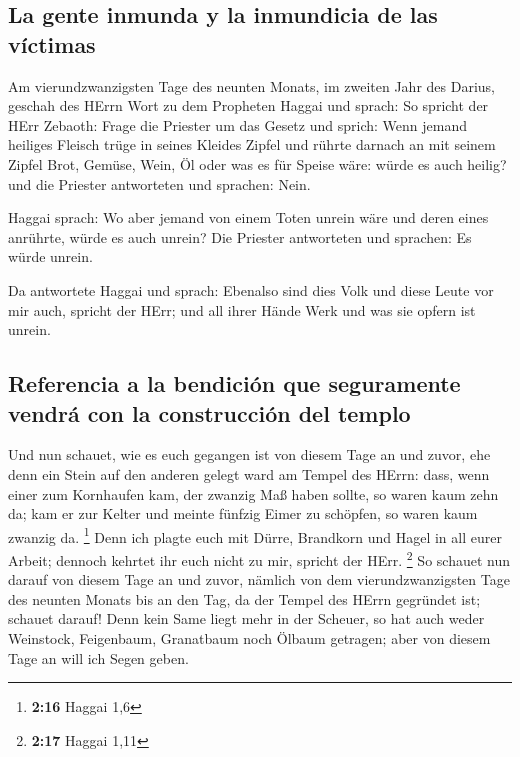 \hypertarget{la-gente-inmunda-y-la-inmundicia-de-las-vuxedctimas}{%
\subsection{La gente inmunda y la inmundicia de las
víctimas}\label{la-gente-inmunda-y-la-inmundicia-de-las-vuxedctimas}}

 Am vierundzwanzigsten Tage des neunten Monats, im
zweiten Jahr des Darius, geschah des HErrn Wort zu dem Propheten Haggai
und sprach:  So spricht der HErr Zebaoth: Frage die
Priester um das Gesetz und sprich:  Wenn jemand heiliges
Fleisch trüge in seines Kleides Zipfel und rührte darnach an mit seinem
Zipfel Brot, Gemüse, Wein, Öl oder was es für Speise wäre: würde es auch
heilig? und die Priester antworteten und sprachen: Nein.

 Haggai sprach: Wo aber jemand von einem Toten unrein
wäre und deren eines anrührte, würde es auch unrein? Die Priester
antworteten und sprachen: Es würde unrein.

 Da antwortete Haggai und sprach: Ebenalso sind dies Volk
und diese Leute vor mir auch, spricht der HErr; und all ihrer Hände Werk
und was sie opfern ist unrein.

\hypertarget{referencia-a-la-bendiciuxf3n-que-seguramente-vendruxe1-con-la-construcciuxf3n-del-templo}{%
\subsection{Referencia a la bendición que seguramente vendrá con la
construcción del
templo}\label{referencia-a-la-bendiciuxf3n-que-seguramente-vendruxe1-con-la-construcciuxf3n-del-templo}}

 Und nun schauet, wie es euch gegangen ist von diesem
Tage an und zuvor, ehe denn ein Stein auf den anderen gelegt ward am
Tempel des HErrn:  dass, wenn einer zum Kornhaufen kam,
der zwanzig Maß haben sollte, so waren kaum zehn da; kam er zur Kelter
und meinte fünfzig Eimer zu schöpfen, so waren kaum zwanzig da.
\footnote{\textbf{2:16} Haggai 1,6}  Denn ich plagte euch
mit Dürre, Brandkorn und Hagel in all eurer Arbeit; dennoch kehrtet ihr
euch nicht zu mir, spricht der HErr. \footnote{\textbf{2:17} Haggai 1,11}
 So schauet nun darauf von diesem Tage an und zuvor,
nämlich von dem vierundzwanzigsten Tage des neunten Monats bis an den
Tag, da der Tempel des HErrn gegründet ist; schauet darauf!
 Denn kein Same liegt mehr in der Scheuer, so hat auch
weder Weinstock, Feigenbaum, Granatbaum noch Ölbaum getragen; aber von
diesem Tage an will ich Segen geben.

